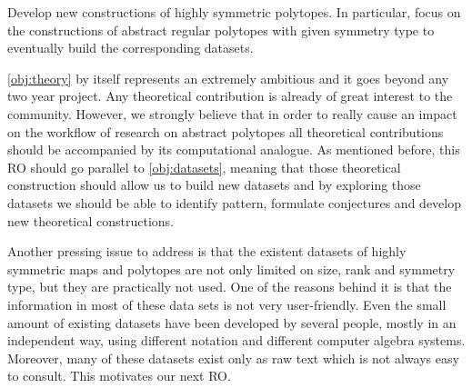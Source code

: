 \begin{obj}\label{obj:theory}
Develop new constructions of highly symmetric polytopes. In particular, focus on the constructions of abstract regular polytopes with given symmetry type to eventually build the corresponding datasets.
\end{obj}

\cref{obj:theory} by itself represents an extremely ambitious and it goes beyond any two year project.
Any theoretical contribution is already of great interest to the community.
However, we strongly believe that in order to really cause an impact on the workflow of research on abstract polytopes all theoretical contributions should be accompanied by its computational analogue.
As mentioned before, this RO should go parallel to \cref{obj:datasets}, meaning that those theoretical construction should allow us to build new datasets and by exploring those datasets we should be able to identify pattern, formulate conjectures and develop new theoretical constructions.

Another pressing issue to address is that the existent datasets of highly symmetric maps and polytopes are not only limited on size, rank and symmetry type, but they are practically not used.
One of the reasons behind it is that the information in most of these data sets is not very user-friendly.
Even the small amount of existing datasets have been developed by several people, mostly in an independent way, using different notation and different computer algebra systems.
Moreover, many of these datasets exist only as raw text which is not always easy to consult.
This motivates our next RO.

